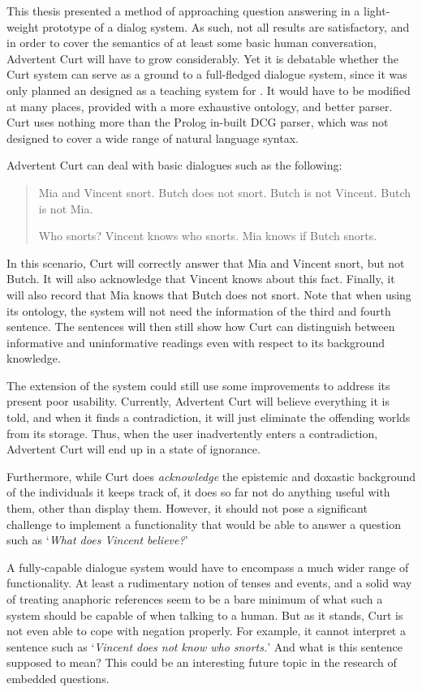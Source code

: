\documentclass[notitlepage,twoside,a4paper]{scrreprt}
\newcommand{\abbr}{\textsf} %
\newcommand{\pn}{\textsf} %
\newcommand{\example}[1]{`\textit{#1}'} %
\newcommand{\curt}{\pn{Curt}}
\newcommand{\acurt}{\pn{Advertent Curt}}
\newcommand{\prol}{\pn{Prolog}}
\theoremstyle{remark}
\theoremstyle{remark}
\theoremstyle{definition}
\theoremstyle{definition}
\begin{document}
This thesis presented a method of approaching question answering in a
light-weight prototype of a dialog system. As such, not all results are
satisfactory, and in order to cover the semantics of at least some basic human
conversation, \acurt{} will have to grow considerably. Yet it is debatable
whether the \curt{} system can serve as a ground to a full-fledged dialogue
system, since it was only planned an designed as a teaching system for
\cite{blackburnbos:cl1}. It would have to be modified at many places, provided
with a more exhaustive ontology, and better parser. \curt{} uses nothing more
than the \prol{} in-built \abbr{DCG} parser, which was not designed to cover a
wide range of natural language syntax.

\acurt{} can deal with basic dialogues such as the following:
\begin{quote}
  Mia and Vincent snort. Butch does not snort. Butch is not Vincent. Butch is
  not Mia.

  Who snorts? Vincent knows who snorts. Mia knows if Butch snorts.
\end{quote}

In this scenario, \curt{} will correctly answer that Mia and Vincent snort, but
not Butch. It will also acknowledge that Vincent knows about this fact. Finally,
it will also record that Mia knows that Butch does not snort. Note that when
using its ontology, the system will not need the information of the third and
fourth sentence. The sentences will then still show how \curt{} can distinguish
between informative and uninformative readings even with respect to its
background knowledge.

The extension of the system could still use some improvements to address its
present poor usability. Currently, \acurt{} will believe everything it is told,
and when it finds a contradiction, it will just eliminate the offending worlds
from its storage. Thus, when the user inadvertently enters a contradiction,
\acurt{} will end up in a state of ignorance.

Furthermore, while \curt{} does \emph{acknowledge} the epistemic and doxastic
background of the individuals it keeps track of, it does so far not do anything
useful with them, other than display them. However, it should not pose a
significant challenge to implement a functionality that would be able to answer
a question such as \example{What does Vincent believe?}

A fully-capable dialogue system would have to encompass a much wider range of
functionality. At least a rudimentary notion of tenses and events, and a solid way of
treating anaphoric references seem to be a bare minimum of what such a system
should be capable of when talking to a human. But as it stands, \curt{} is not
even able to cope with negation properly. For example, it cannot interpret a
sentence such as \example{Vincent does not know who snorts.} And what is this
sentence supposed to mean? This could be an interesting future topic in the
research of embedded questions.
\end{document}
